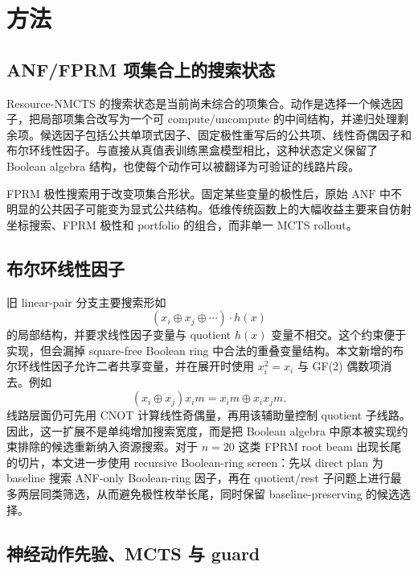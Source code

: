 \documentclass[UTF8,fontset=macnew,11pt]{ctexart}
\newcommand{\method}{Resource-NMCTS}
\newcommand{\anf}{\ensuremath{\mathrm{ANF}}}
\begin{document}
\section{方法}

\subsection{ANF/FPRM 项集合上的搜索状态}

\method{} 的搜索状态是当前尚未综合的项集合。动作是选择一个候选因子，把局部项集合改写为一个可 compute/uncompute 的中间结构，并递归处理剩余项。候选因子包括公共单项式因子、固定极性重写后的公共项、线性奇偶因子和布尔环线性因子。与直接从真值表训练黑盒模型相比，这种状态定义保留了 Boolean algebra 结构，也使每个动作可以被翻译为可验证的线路片段。

FPRM 极性搜索用于改变项集合形状。固定某些变量的极性后，原始 \anf{} 中不明显的公共因子可能变为显式公共结构。低维传统函数上的大幅收益主要来自仿射坐标搜索、FPRM 极性和 portfolio 的组合，而非单一 MCTS rollout。

\subsection{布尔环线性因子}

旧 linear-pair 分支主要搜索形如
\begin{equation}
  (x_i\oplus x_j\oplus\cdots)\cdot h(x)
  \label{eq:linear_factor}
\end{equation}
的局部结构，并要求线性因子变量与 quotient $h(x)$ 变量不相交。这个约束便于实现，但会漏掉 square-free Boolean ring 中合法的重叠变量结构。本文新增的布尔环线性因子允许二者共享变量，并在展开时使用 $x_i^2=x_i$ 与 GF(2) 偶数项消去。例如
\begin{equation}
  (x_i\oplus x_j)x_i m = x_i m \oplus x_i x_j m .
  \label{eq:boolean_ring}
\end{equation}
线路层面仍可先用 CNOT 计算线性奇偶量，再用该辅助量控制 quotient 子线路。因此，这一扩展不是单纯增加搜索宽度，而是把 Boolean algebra 中原本被实现约束排除的候选重新纳入资源搜索。对于 $n=20$ 这类 FPRM root beam 出现长尾的切片，本文进一步使用 recursive Boolean-ring screen：先以 direct plan 为 baseline 搜索 ANF-only Boolean-ring 因子，再在 quotient/rest 子问题上进行最多两层同类筛选，从而避免极性枚举长尾，同时保留 baseline-preserving 的候选选择。

\subsection{神经动作先验、MCTS 与 guard}
\end{document}
